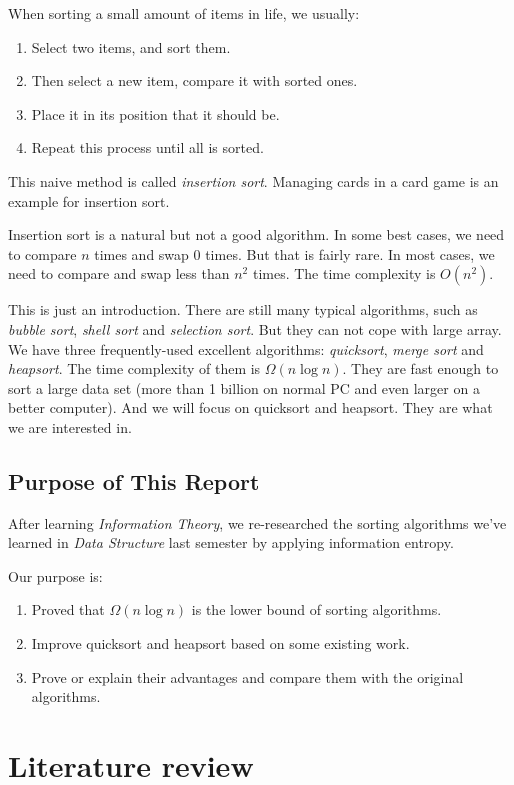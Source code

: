 \documentclass[12pt]{extarticle}
\newcommand{\<}{\langle}
\renewcommand{\>}{\rangle}
\theoremstyle{definition}
\begin{document}
When sorting a small amount of items in life, we usually:
\begin{enumerate}
	\item Select two items, and sort them.
	\item Then select a new item, compare it with sorted ones.
	\item Place it in its position that it should be.
	\item Repeat this process until all is sorted.
\end{enumerate}

This naive method is called \textit{insertion sort}. Managing cards in a card game is an example for insertion sort.

Insertion sort is a natural but not a good algorithm. In some best cases, we need to compare $n$ times and swap $0$ times. But that is fairly rare. In most cases, we need to compare and swap less than $n^2$ times. The time complexity is $O(n^2)$.

This is just an introduction. There are still many typical algorithms, such as \textit{bubble sort}, \textit{shell sort} and \textit{selection sort}. But they can not cope with large array. We have three frequently-used excellent algorithms: \textit{quicksort}, \textit{merge sort} and \textit{heapsort}. The time complexity of them is $\Omega(n \log n)$. They are fast enough to sort a large data set (more than 1 billion on normal PC and even larger on a better computer). And we will focus on quicksort and heapsort. They are what we are interested in. 

\subsection{Purpose of This Report}

After learning \textit{Information Theory}, we re-researched the sorting algorithms we've learned in \textit{Data Structure} last semester by applying information entropy. 

Our purpose is: 
\begin{enumerate}
	\item Proved that $\Omega(n \log n)$ is the lower bound of sorting algorithms.
	\item Improve quicksort and heapsort based on some existing work.
	\item Prove or explain their advantages and compare them with the original algorithms.
\end{enumerate}

\section{Literature review}
\end{document}

